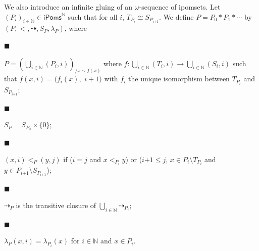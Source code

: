 \documentclass[10pt,a4paper]{article}
\begin{document}
 
We also introduce an infinite gluing of an $\omega$-sequence of ipomsets. Let $(P_{i})_{i\in\mathbb{N}}\in\mathsf{iPoms}^{\mathbb{N}}$ such that for all $i$, $T_{P_{i}}\cong S_{P_{i\text{+}1}}$. We define $P=P_{0}*P_{1}*\cdots$ by $(P,<,\dashrightarrow,S_{P},\lambda_{P})$, where\par
  
\par\noindent  $\blacksquare$ 
 
$P=(\bigcup\nolimits_{i\in\mathbb{N}}(P_{i},i))_{/x\sim f(x)}$ where $f:\bigcup\nolimits_{i\in\mathbb{N}}(T_{i},i)\rightarrow\bigcup\nolimits_{i\in\mathbb{N}}(S_{i},i)$ such that $f(x,i)=(f_{i}(x),$ $i+1)$ with $f_{i}$ the unique isomorphism between $T_{P_{i}}$ and $S_{P_{i\text{+}1}}$;\par
 
 
 
\par\noindent  $\blacksquare$ 
 
$S_{P}=S_{P_{0}}\times{\{0\}}$;\par
 
 
 
\par\noindent  $\blacksquare$ 
 
$(x,i)<_{P}(y,j)$ if ($i=j$ and $x<_{P_{i}}y$) or ($i\text{+}1\leqslant j$, $x\in P_{i}\setminus T_{P_{i}}$ and $y\in P_{i\text{+}1}\setminus S_{P_{i\text{+}1}}$);\par
 
 
 
\par\noindent  $\blacksquare$ 
 
$\dashrightarrow_{P}$ is the transitive closure of $\bigcup_{i\in\mathbb{N}}\dashrightarrow_{P_{i}}$;\par
 
 
 
\par\noindent  $\blacksquare$ 
 
$\lambda_{P}(x,i)=\lambda_{P_{i}}(x)$ for $i\in\mathbb{N}$ and $x\in P_{i}$.\par
 
 
  
 
 
\end{document}
